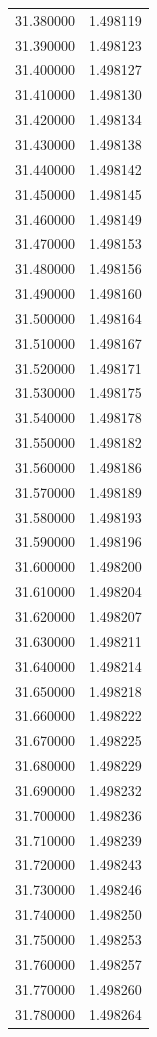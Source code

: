 \begin{tabular}{rr}
31.380000 & 1.498119 \\
31.390000 & 1.498123 \\
31.400000 & 1.498127 \\
31.410000 & 1.498130 \\
31.420000 & 1.498134 \\
31.430000 & 1.498138 \\
31.440000 & 1.498142 \\
31.450000 & 1.498145 \\
31.460000 & 1.498149 \\
31.470000 & 1.498153 \\
31.480000 & 1.498156 \\
31.490000 & 1.498160 \\
31.500000 & 1.498164 \\
31.510000 & 1.498167 \\
31.520000 & 1.498171 \\
31.530000 & 1.498175 \\
31.540000 & 1.498178 \\
31.550000 & 1.498182 \\
31.560000 & 1.498186 \\
31.570000 & 1.498189 \\
31.580000 & 1.498193 \\
31.590000 & 1.498196 \\
31.600000 & 1.498200 \\
31.610000 & 1.498204 \\
31.620000 & 1.498207 \\
31.630000 & 1.498211 \\
31.640000 & 1.498214 \\
31.650000 & 1.498218 \\
31.660000 & 1.498222 \\
31.670000 & 1.498225 \\
31.680000 & 1.498229 \\
31.690000 & 1.498232 \\
31.700000 & 1.498236 \\
31.710000 & 1.498239 \\
31.720000 & 1.498243 \\
31.730000 & 1.498246 \\
31.740000 & 1.498250 \\
31.750000 & 1.498253 \\
31.760000 & 1.498257 \\
31.770000 & 1.498260 \\
31.780000 & 1.498264 \\

\end{tabular}
